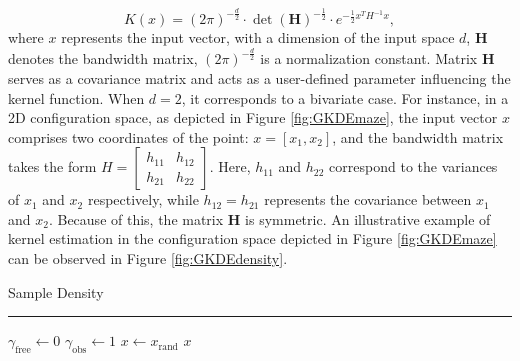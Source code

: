 \documentclass{ctuthesis}
\begin{document}
\[
K(x) = (2\pi)^{-\frac{d}{2}} \cdot \det(\textbf{H})^{-\frac{1}{2}} \cdot e^{-\frac{1}{2} x^T H^{-1} x},
\]
where \( x \) represents the input vector, 
with a dimension of the input space \( d \), 
\( \textbf{H} \) denotes the bandwidth matrix,
\((2\pi)^{-\frac{d}{2}}\) is a normalization constant.
Matrix \( \textbf{H} \) serves as a covariance matrix and 
acts as a user-defined parameter influencing the kernel function. 
When \( d = 2 \), it corresponds to a bivariate case. 
For instance, in a 2D configuration space, as depicted in Figure \ref{fig:GKDEmaze}, 
the input vector \( x \) comprises two coordinates of the point: \( x = [x_1, x_2] \), and 
the bandwidth matrix takes the 
form \( H = \left[ \begin{array}{cc} h_{11} & h_{12} \\ h_{21} & h_{22} \end{array} \right] \). 
Here, \( h_{11} \) and \( h_{22} \) correspond to the variances 
of \( x_1 \) and \( x_2 \) respectively, 
while \( h_{12} = h_{21} \) represents the covariance between \( x_1 \) and \( x_2 \). 
Because of this, the matrix \( \textbf{H} \) is symmetric. 
An illustrative example of kernel estimation in the configuration space depicted 
in Figure \ref{fig:GKDEmaze} can be observed in Figure \ref{fig:GKDEdensity}.
\\[12pt]
\begin{algorithm}[H]
  \caption{Sample Density}
  \label{alg:sample_density}
  \vspace{0.1cm}
  \hrule
  \vspace{0.2cm}
  $\gamma_{\text{free}} \gets 0$\;
  $\gamma_{\text{obs}} \gets 1$\; 
  $x \gets x_{\text{rand}}$\;
  \Return $x$\;
\end{algorithm} 
\end{document}
